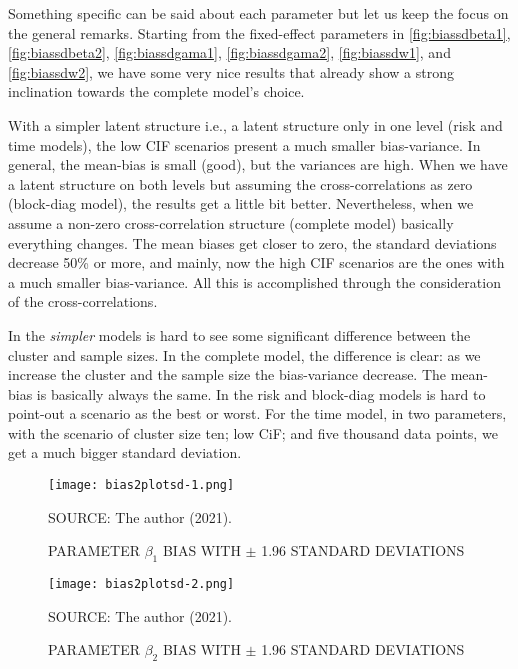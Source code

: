 Something specific can be said about each parameter but let us keep the
focus on the general remarks. Starting from the fixed-effect parameters
in \autoref{fig:biassdbeta1}, \autoref{fig:biassdbeta2},
\autoref{fig:biassdgama1}, \autoref{fig:biassdgama2},
\autoref{fig:biassdw1}, and \autoref{fig:biassdw2}, we have some very
nice results that already show a strong inclination towards the complete
model's choice.

With a simpler latent structure i.e., a latent structure only in one
level (risk and time models), the low CIF scenarios present a much
smaller bias-variance. In general, the mean-bias is small (good), but
the variances are high. When we have a latent structure on both levels
but assuming the cross-correlations as zero (block-diag model), the
results get a little bit better. Nevertheless, when we assume a non-zero
cross-correlation structure (complete model) basically everything
changes. The mean biases get closer to zero, the standard deviations
decrease 50\% or more, and mainly, now the high CIF scenarios are the
ones with a much smaller bias-variance. All this is accomplished through
the consideration of the cross-correlations.

In the \textit{simpler} models is hard to see some significant
difference between the cluster and sample sizes. In the complete model,
the difference is clear: as we increase the cluster and the sample size
the bias-variance decrease. The mean-bias is basically always the
same. In the risk and block-diag models is hard to point-out a scenario
as the best or worst. For the time model, in two parameters, with the
scenario of cluster size ten; low CiF; and five thousand data points, we
get a much bigger standard deviation.

\begin{figure}[H]
 \setlength{\abovecaptionskip}{.0001pt}
 \caption{PARAMETER \(\beta_{1}\) BIAS WITH \(\pm\) 1.96 STANDARD
          DEVIATIONS}
 \vspace{0.2cm}\centering
 \texttt{[image: bias2plotsd-1.png]}\\
 \begin{footnotesize}
  SOURCE: The author (2021).
 \end{footnotesize}
 \label{fig:biassdbeta1}
\end{figure}

\begin{figure}[H]
 \setlength{\abovecaptionskip}{.0001pt}
 \caption{PARAMETER \(\beta_{2}\) BIAS WITH \(\pm\) 1.96 STANDARD
         DEVIATIONS}
 \vspace{0.2cm}\centering
 \texttt{[image: bias2plotsd-2.png]}\\
 \begin{footnotesize}
  SOURCE: The author (2021).
 \end{footnotesize}
 \label{fig:biassdbeta2}
\end{figure}

